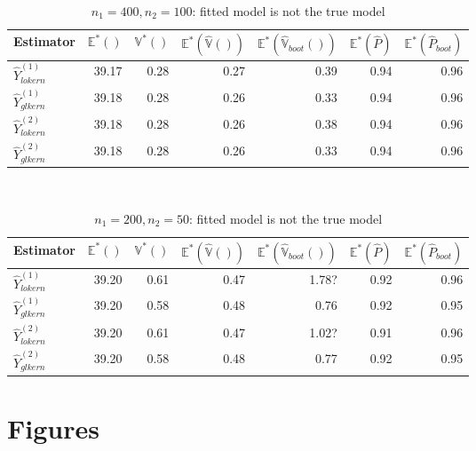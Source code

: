 \documentclass[a4paper,12pt,leqno, titlepage]{article}
\newcommand{\EX}{\mathbb{E}}
\newcommand{\VAR}{\mathbb{V}}
\begin{document}
\begin{appendix}
{{{\begin{table}[h]
\begin{tabular}{lrrrrrr}
\end{tabular}
\end{table}
\clearpage\newpage
\small
\begin{table}[h]
\centering
\caption{$n_1=400,n_2=100$: fitted model is not the true model }\label{appsimul3}\\[0.5cm]
\begin{tabular}{lrrrrrr}
  \hline
Estimator & $\EX^*()$ & $\VAR^*()$ & $\EX^*(\hat{\VAR}())$ & $\EX^*(\hat{\VAR}_{boot}())$ & $\EX^*(\hat{P})$ & $\EX^*(\hat{P}_{boot})$ \\ \hline
 $\hat{Y}^{(1)}_{lokern}$     & 39.17 & 0.28 & 0.27 &0.39 &0.94 & 0.96\\
 $\hat{Y}^{(1)}_{glkern}$     & 39.18 & 0.28 & 0.26 &0.33 &0.94 & 0.96\\
 $\hat{Y}^{(2)}_{lokern}$     & 39.18 & 0.28 & 0.26 &0.38 &0.94 & 0.96\\
 $\hat{Y}^{(2)}_{glkern}$     & 39.18 & 0.28 & 0.26 &0.33 &0.94 & 0.96\\ \hline
\end{tabular}
\end{table}
\begin{table}[h]
\centering
\caption{$n_1=200,n_2=50$: fitted model is not the true model }\label{appsimul3}\\[0.5cm]
\begin{tabular}{lrrrrrr}
  \hline
Estimator & $\EX^*()$ & $\VAR^*()$ & $\EX^*(\hat{\VAR}())$ & $\EX^*(\hat{\VAR}_{boot}())$ & $\EX^*(\hat{P})$ & $\EX^*(\hat{P}_{boot})$ \\ \hline
$\hat{Y}^{(1)}_{lokern}$     & 39.20 & 0.61 & 0.47 & 1.78?     & 0.92 &  0.96\\
 $\hat{Y}^{(1)}_{glkern}$    & 39.20 & 0.58 & 0.48 & 0.76      & 0.92 &  0.95\\
 $\hat{Y}^{(2)}_{lokern}$    & 39.20 & 0.61 & 0.47 & 1.02?     & 0.91 &  0.96\\
 $\hat{Y}^{(2)}_{glkern}$    & 39.20 & 0.58 & 0.48 & 0.77      & 0.92 &  0.95\\ \hline
\end{tabular}
\end{table}


\clearpage\newpage









\section{Figures}\label{appendixfigures}

}}}
\end{appendix}
\end{document}
